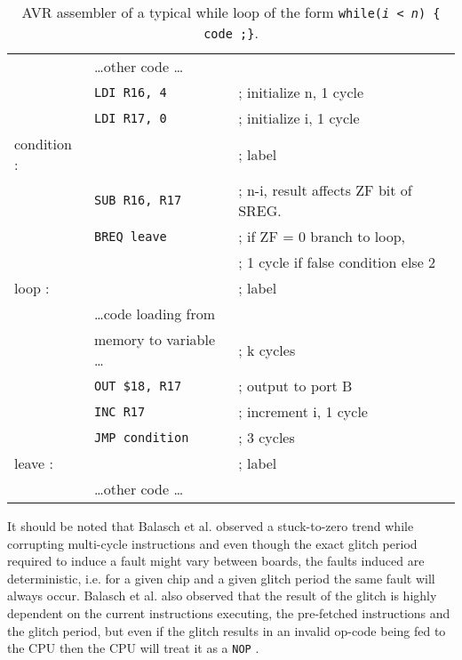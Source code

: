 \begin{table}
\caption{\footnotesize AVR assembler of  a typical while loop of the form \texttt{while(\emph{i < n}) \{ code ;\}}.}
\label{tab:while}
\center
\begin{tabular}{ l l l }
& \dots other code \dots & \\
&\texttt{LDI R16, 4 }& ; initialize n, 1 cycle\\
&\texttt{LDI R17, 0 }& ; initialize i, 1 cycle \\
condition : &&  ; label\\
& \texttt{SUB R16, R17 }& ; n-i, result affects ZF bit of SREG.\\
& \texttt{BREQ leave} & ; if ZF = 0 branch to loop,\\
& &  ; 1 cycle if false condition else 2\\
loop :  & & ; label\\
& \dots code loading from  &\\
& memory to variable \dots & ; k cycles\\
& \texttt{OUT \$18, R17} & ; output to port B\\
& \texttt{INC R17 }& ; increment i, 1 cycle \\
& \texttt{JMP condition }& ; 3 cycles \\
leave : && ; label \\
& \dots other code \dots & \\
\end{tabular}
\end{table}

It should be noted that Balasch et al. \citep{glitches_paper} observed a stuck-to-zero trend while corrupting multi-cycle instructions and even though the exact glitch period required to induce a fault might vary between boards, the faults  induced are deterministic, i.e. for a given chip and a given glitch period the same fault will always occur. Balasch et al. \citep{glitches_paper} also observed that the result of the glitch is highly dependent on the current instructions executing, the pre-fetched instructions and the glitch period, but even if the glitch results in an invalid op-code being fed to the CPU then the CPU will treat it as a \texttt{NOP} . 